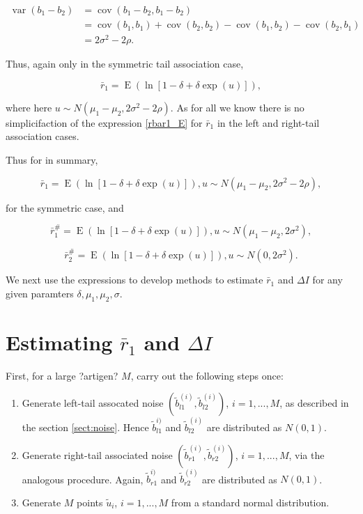 \documentclass[letterpaper,11pt]{article}
\DeclareMathOperator{\EX}{E}%
\DeclareMathOperator{\VarX}{var}
\DeclareMathOperator{\CovX}{cov}
\begin{document}
\begin{align}
\VarX(b_1-b_2)&=\CovX(b_1-b_2, b_1-b_2) \\
                        &=\CovX(b_1,b_1)+\CovX(b_2,b_2)-\CovX(b_1,b_2)-\CovX(b_2,b_1) \\
                        &=2\sigma^2-2\rho.
\end{align}

\noindent Thus, again only in the symmetric tail association case,

\begin{equation}
\bar r_1 = \EX(\ln[1-\delta+\delta \exp(u)]), \label{rbar1_E_usub}
\end{equation}

\noindent where here $u \sim N(\mu_1-\mu_2, 2\sigma^2-2\rho)$. As for all we know there is no simplicifaction of the expression \ref{rbar1_E}  for $\bar r_1$ in the left and right-tail association cases. 

Thus for in summary,

\begin{equation}
\bar r_1 = \EX(\ln[1-\delta+\delta \exp(u)]), u \sim N(\mu_1-\mu_2, 2\sigma^2-2\rho), \label{sym_rbar1}
\end{equation}

\noindent for the symmetric case, and 

\begin{equation}
\bar r_1^{\#} = \EX(\ln[1-\delta+\delta \exp(u)]), u \sim N(\mu_1-\mu_2, 2\sigma^2), \label{sym_rbar1sharp}
\end{equation}

\begin{equation}
\bar r_2^{\#} = \EX(\ln[1-\delta+\delta \exp(u)]), u \sim N(0, 2\sigma^2). \label{sym_rbar2sharp}
\end{equation}

\noindent We next use the expressions to develop methods to estimate $\bar r_1$ and $\Delta I$ for any given paramters $\delta,\mu_1,\mu_2,\sigma$.



\section{Estimating $\bar r_1$ and $\Delta I$}

First, for a large ?artigen? $M$, carry out the following steps once:

\begin{enumerate}
\item Generate left-tail assocated noise $(\tilde b_{l1}^{(i)}, \tilde b_{l2}^{(i)})$, $i=1,...,M$, as described in the section \ref{sect:noise}. Hence $\tilde b_{l1}^{i)}$ and $\tilde b_{l2}^{(i)}$ are distributed as $N(0,1)$. 
\item Generate right-tail associated noise $(\tilde b_{r1}^{(i)}, \tilde b_{r2}^{(i)})$, $i=1,...,M$, via the analogous procedure. Again, $\tilde b_{r1}^{i)}$ and $\tilde b_{r2}^{(i)}$ are distributed as $N(0,1)$. 
\item Generate $M$ points $\tilde u_i$, $i = 1,...,M$ from a standard normal distribution. 
\end{enumerate}
\end{document}
